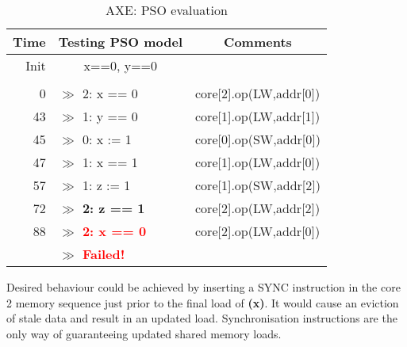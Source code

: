 			\captionsetup[table]{name=Trace}
			\begin{table}[!h]	
			\begin{center}
			\selectfont
			\begin{tabular}{|r|l|l|}
				\hline
				\textbf{Time} & \textbf{Testing PSO model} & \multicolumn{1}{c|}{\textbf{Comments}} \\
				\hline 
				Init & \multicolumn{1}{c|}{x==0, y==0} & \\
				& & \\
				0 & $\gg$ 2: x == 0 & core[2].op(LW,addr[0]) \\
				43 & $\gg$ 1: y == 0 & core[1].op(LW,addr[1]) \\
				45 & $\gg$ 0: x := 1 & core[0].op(SW,addr[0]) \\
				47 & $\gg$ 1: x == 1 & core[1].op(LW,addr[0]) \\
				57 & $\gg$ 1: z := 1 & core[1].op(SW,addr[2]) \\
				72 & $\gg$ \textbf{\textcolor{BurntOrange}{2: z == 1}} & core[2].op(LW,addr[2]) \\
				88 & $\gg$ \textbf{\textcolor{Red}{2: x == 0}} & core[2].op(LW,addr[0]) \\
				& $\gg$ \textbf{\textcolor{Red}{Failed!}} & \\
				\hline
			\end{tabular}
			\caption{AXE: PSO evaluation}
			\label{pso_test_mem}
			\end{center} 
			\end{table}
			\captionsetup[table]{name=Table}

						\begin{comment}
						setAddrMap(< 5,  3,  2,  0>)
						chooseVars(<V 0xa 0x1 0x3 0xf  >)
						2095: core[2].op(LW,'h3)
						2138: core[1].op(LW,'h0)
						2140: core[0].op(SW,'h3)
						2142: core[1].op(LW,'h3)
						2152: core[1].op(SW,'h2)
						2167: core[2].op(LW,'h2)
						2183: core[2].op(LW,'h3)
						2: v15 == 0 %
						1: v10 == 0 %
						0: v15 := 8 %
						1: v15 == 8 %
						1: v3 := 9 %
						2: v3 == 9 %
						2: v15 == 0 %
						Failed!
						\end{comment}
			
			Desired behaviour could be achieved by inserting a SYNC instruction in the core 2 memory sequence just prior to the final load of \textbf{(x)}. It would cause an eviction of stale data and result in an updated load. Synchronisation instructions are the only way of guaranteeing updated shared memory loads.
			
